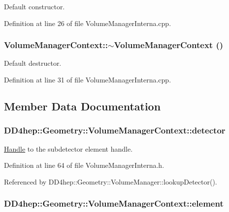 Default constructor. 

Definition at line 26 of file VolumeManagerInterna.cpp.\hypertarget{class_d_d4hep_1_1_geometry_1_1_volume_manager_context_aa150cfab1e19826e9e6fddd194b2390a}{
\subsubsection[{$\sim$VolumeManagerContext}]{\setlength{\rightskip}{0pt plus 5cm}VolumeManagerContext::$\sim$VolumeManagerContext ()}}
\label{class_d_d4hep_1_1_geometry_1_1_volume_manager_context_aa150cfab1e19826e9e6fddd194b2390a}


Default destructor. 

Definition at line 31 of file VolumeManagerInterna.cpp.

\subsection{Member Data Documentation}
\hypertarget{class_d_d4hep_1_1_geometry_1_1_volume_manager_context_a4b637a36900149ff3490731f62ca1d52}{
\subsubsection[{detector}]{ {\bf DD4hep::Geometry::VolumeManagerContext::detector}}}
\label{class_d_d4hep_1_1_geometry_1_1_volume_manager_context_a4b637a36900149ff3490731f62ca1d52}


\hyperlink{class_d_d4hep_1_1_handle}{Handle} to the subdetector element handle. 

Definition at line 64 of file VolumeManagerInterna.h.

Referenced by DD4hep::Geometry::VolumeManager::lookupDetector().\hypertarget{class_d_d4hep_1_1_geometry_1_1_volume_manager_context_a57c697291054cc0fa221f047dd32938f}{
\subsubsection[{element}]{ {\bf DD4hep::Geometry::VolumeManagerContext::element}}}
\label{class_d_d4hep_1_1_geometry_1_1_volume_manager_context_a57c697291054cc0fa221f047dd32938f}


